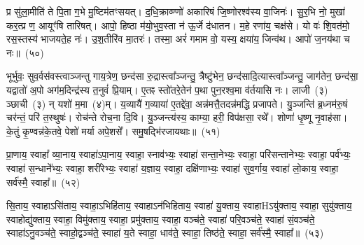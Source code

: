 प्र सु॑ला॒मीति॑ ते पि॒ता ग॒भे मु॒ष्टिम॑तꣳसयत्। द॒धि॒क्राव्ण्णो॑ अकारिषं जि॒ष्णोरश्व॑स्य वा॒जिनः॑। सु॒र॒भि नो॒ मुखा॑ कर॒त्प्र ण॒ आयूꣳ॑षि तारिषत्। आपो॒ हि\-ष्ठा म॑यो॒भुव॒स्ता न॑ ऊ॒र्जे द॑धातन। म॒हे रणा॑य॒ चक्ष॑से। यो वः॑ शि॒वत॑मो॒ रस॒स्तस्य॑ भाजयते॒ह नः॑। उ॒श॒तीरि॑व मा॒तरः॑। तस्मा॒ अरं॑ गमाम वो॒ यस्य॒ क्षया॑य॒ जिन्व॑थ। आपो॑ ज॒नय॑था च नः॥~(५०)

{\anuvakamend[{आ॒सा॒मत्ति॒ न रो॑हतो॒ जिन्व॑थ च॒त्वारि॑ च}]}%

भूर्भुवः॒ सुव॒र्वस॑वस्त्वाञ्जन्तु गाय॒त्रेण॒ छन्द॑सा रु॒द्रास्त्वा᳚ञ्जन्तु॒ त्रैष्टु॑भेन॒ छन्द॑सादि॒त्यास्त्वा᳚ञ्जन्तु॒ जाग॑तेन॒ छन्द॑सा॒ यद्वातो॑ अ॒पो अग॑म॒दिन्द्र॑स्य त॒नुवं॑ प्रि॒याम्। ए॒तꣴ स्तो॑तरे॒तेन॑ प॒था पुन॒रश्व॒मा व॑र्तयासि नः। लाजी~(३) ञ्छाची~(३) न् यशो॑ म॒मा~(४)म्। य॒व्यायै॑ ग॒व्याया॑ ए॒तद्दे॑वा॒ अन्न॑मत्तै॒तदन्न॑मद्धि प्रजापते। यु॒ञ्जन्ति॑ ब्र॒ध्नम॑रु॒षं चर॑न्तं॒ परि॑ त॒स्थुषः॑। रोच॑न्ते रोच॒ना दि॒वि। यु॒ञ्जन्त्य॑स्य॒ काम्या॒ हरी॒ विप॑क्षसा॒ रथे᳚। शोणा॑ धृ॒ष्णू नृ॒वाह॑सा। के॒तुं कृ॒ण्वन्न॑के॒तवे॒ पेशो॑ मर्या अपे॒शसे᳚। समु॒षद्भि॑रजायथाः॥~(५१)

{\anuvakamend[{ब्र॒ध्नं पञ्च॑विꣳशतिश्च}]}%

प्रा॒णाय॒ स्वाहा᳚ व्या॒नाय॒ स्वाहा॑\-ऽपा॒नाय॒ स्वाहा॒ स्नाव॑भ्यः॒ स्वाहा॑ सन्ता॒नेभ्यः॒ स्वाहा॒ परि॑सन्तानेभ्यः॒ स्वाहा॒ पर्व॑भ्यः॒ स्वाहा॑ स॒न्धाने᳚भ्यः॒ स्वाहा॒ शरी॑रेभ्यः॒ स्वाहा॑ य॒ज्ञाय॒ स्वाहा॒ दक्षि॑णाभ्यः॒ स्वाहा॑ सुव॒र्गाय॒ स्वाहा॑ लो॒काय॒ स्वाहा॒ सर्व॑स्मै॒ स्वाहा᳚॥~(५२)

{\anuvakamend[{प्रा॒णाया॒ष्टाविꣳ॑शतिः}]}%

सि॒ताय॒ स्वाहा\-ऽसि॑ताय॒ स्वाहा॒\-ऽभिहि॑ताय॒ स्वाहा\-ऽन॑भिहिताय॒ स्वाहा॑ यु॒क्ताय॒ स्वाहाH\-ऽयु॑क्ताय॒ स्वाहा॒ सुयु॑क्ताय॒ स्वाहोद्यु॑क्ताय॒ स्वाहा॒ विमु॑क्ताय॒ स्वाहा॒ प्रमु॑क्ताय॒ स्वाहा॒ वञ्च॑ते॒ स्वाहा॑ परि॒वञ्च॑ते॒ स्वाहा॑ सं॒वञ्च॑ते॒ स्वाहा॑\-ऽनु॒वञ्च॑ते॒ स्वाहो॒द्वञ्च॑ते॒ स्वाहा॑ य॒ते स्वाहा॒ धाव॑ते॒ स्वाहा॒ तिष्ठ॑ते॒ स्वाहा॒ सर्व॑स्मै॒ स्वाहा᳚॥~(५३)

{\anuvakamend[{सि॒ताया॒ष्टात्रिꣳ॑शत्}]}%

